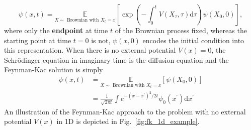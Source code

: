 \begin{equation}
	\psi(x, t)=\underset{X \sim \text { Brownian with } X_{t}=x}{\mathbb{E}}
	\left[\exp \left(-\int_{0}^{t}  V\left(X_{\tau}, \tau \right) \mathrm{d}\tau \right) \psi\left(X_{0}, 0\right)\right],
\end{equation}
where only the \textbf{endpoint} at time $t$ of the Brownian process fixed, whereas the starting point at time $t=0$ is not, $\psi (x, 0)$ encodes the initial condition into this representation. When there is no external potential $V(x) = 0$, the Schr\" odinger equation in imaginary time is the diffusion equation and the Feynman-Kac solution is simply
\begin{equation}
	\begin{aligned} 
		\psi(x, t) &= \underset{X \sim \text { Brownian with } X_{t}=x}{\mathbb{E}}\left[\psi\left(X_{0}, 0\right)\right] \\
		&=  
		\frac{1}{\sqrt{2 \pi t}} \int  e^{-\left(x-x^{\prime}\right)^{2} / 2 t} \psi_{0}\left(x^{\prime}\right) \mathrm{d} x^{\prime}
	\end{aligned}
\end{equation}
An illustration of the Feynman-Kac approach to the problem with no external potential $V(x)$ in 1D is depicted in Fig.~\ref{fig:fk_1d_example}.

